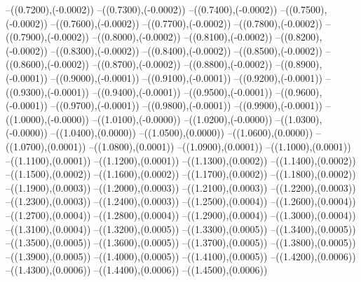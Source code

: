 {	--({\sx*(0.7200)},{\sy*(-0.0002)})
	--({\sx*(0.7300)},{\sy*(-0.0002)})
	--({\sx*(0.7400)},{\sy*(-0.0002)})
	--({\sx*(0.7500)},{\sy*(-0.0002)})
	--({\sx*(0.7600)},{\sy*(-0.0002)})
	--({\sx*(0.7700)},{\sy*(-0.0002)})
	--({\sx*(0.7800)},{\sy*(-0.0002)})
	--({\sx*(0.7900)},{\sy*(-0.0002)})
	--({\sx*(0.8000)},{\sy*(-0.0002)})
	--({\sx*(0.8100)},{\sy*(-0.0002)})
	--({\sx*(0.8200)},{\sy*(-0.0002)})
	--({\sx*(0.8300)},{\sy*(-0.0002)})
	--({\sx*(0.8400)},{\sy*(-0.0002)})
	--({\sx*(0.8500)},{\sy*(-0.0002)})
	--({\sx*(0.8600)},{\sy*(-0.0002)})
	--({\sx*(0.8700)},{\sy*(-0.0002)})
	--({\sx*(0.8800)},{\sy*(-0.0002)})
	--({\sx*(0.8900)},{\sy*(-0.0001)})
	--({\sx*(0.9000)},{\sy*(-0.0001)})
	--({\sx*(0.9100)},{\sy*(-0.0001)})
	--({\sx*(0.9200)},{\sy*(-0.0001)})
	--({\sx*(0.9300)},{\sy*(-0.0001)})
	--({\sx*(0.9400)},{\sy*(-0.0001)})
	--({\sx*(0.9500)},{\sy*(-0.0001)})
	--({\sx*(0.9600)},{\sy*(-0.0001)})
	--({\sx*(0.9700)},{\sy*(-0.0001)})
	--({\sx*(0.9800)},{\sy*(-0.0001)})
	--({\sx*(0.9900)},{\sy*(-0.0001)})
	--({\sx*(1.0000)},{\sy*(-0.0000)})
	--({\sx*(1.0100)},{\sy*(-0.0000)})
	--({\sx*(1.0200)},{\sy*(-0.0000)})
	--({\sx*(1.0300)},{\sy*(-0.0000)})
	--({\sx*(1.0400)},{\sy*(0.0000)})
	--({\sx*(1.0500)},{\sy*(0.0000)})
	--({\sx*(1.0600)},{\sy*(0.0000)})
	--({\sx*(1.0700)},{\sy*(0.0001)})
	--({\sx*(1.0800)},{\sy*(0.0001)})
	--({\sx*(1.0900)},{\sy*(0.0001)})
	--({\sx*(1.1000)},{\sy*(0.0001)})
	--({\sx*(1.1100)},{\sy*(0.0001)})
	--({\sx*(1.1200)},{\sy*(0.0001)})
	--({\sx*(1.1300)},{\sy*(0.0002)})
	--({\sx*(1.1400)},{\sy*(0.0002)})
	--({\sx*(1.1500)},{\sy*(0.0002)})
	--({\sx*(1.1600)},{\sy*(0.0002)})
	--({\sx*(1.1700)},{\sy*(0.0002)})
	--({\sx*(1.1800)},{\sy*(0.0002)})
	--({\sx*(1.1900)},{\sy*(0.0003)})
	--({\sx*(1.2000)},{\sy*(0.0003)})
	--({\sx*(1.2100)},{\sy*(0.0003)})
	--({\sx*(1.2200)},{\sy*(0.0003)})
	--({\sx*(1.2300)},{\sy*(0.0003)})
	--({\sx*(1.2400)},{\sy*(0.0003)})
	--({\sx*(1.2500)},{\sy*(0.0004)})
	--({\sx*(1.2600)},{\sy*(0.0004)})
	--({\sx*(1.2700)},{\sy*(0.0004)})
	--({\sx*(1.2800)},{\sy*(0.0004)})
	--({\sx*(1.2900)},{\sy*(0.0004)})
	--({\sx*(1.3000)},{\sy*(0.0004)})
	--({\sx*(1.3100)},{\sy*(0.0004)})
	--({\sx*(1.3200)},{\sy*(0.0005)})
	--({\sx*(1.3300)},{\sy*(0.0005)})
	--({\sx*(1.3400)},{\sy*(0.0005)})
	--({\sx*(1.3500)},{\sy*(0.0005)})
	--({\sx*(1.3600)},{\sy*(0.0005)})
	--({\sx*(1.3700)},{\sy*(0.0005)})
	--({\sx*(1.3800)},{\sy*(0.0005)})
	--({\sx*(1.3900)},{\sy*(0.0005)})
	--({\sx*(1.4000)},{\sy*(0.0005)})
	--({\sx*(1.4100)},{\sy*(0.0005)})
	--({\sx*(1.4200)},{\sy*(0.0006)})
	--({\sx*(1.4300)},{\sy*(0.0006)})
	--({\sx*(1.4400)},{\sy*(0.0006)})
	--({\sx*(1.4500)},{\sy*(0.0006)})
}
